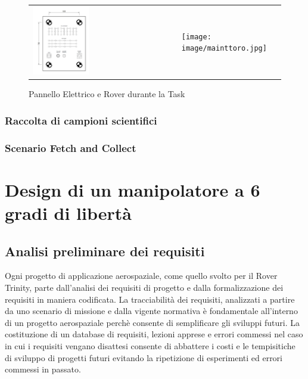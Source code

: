 \documentclass[%
corpo=11pt,
twoside,
 stile=classica,
oldstyle,
greek,%
]{toptesi}
\begin{document}
		\begin{figure}
		\centering
		\begin{tabular}{ll}
		\includegraphics[width=0.4\textwidth]{image/panel.png}
		&
		\texttt{[image: image/mainttoro.jpg]}
		\end{tabular}
		\caption{Pannello Elettrico e Rover durante la Task}
		\label{fig:maintanance}
		\end{figure}
	
		\subsection{Raccolta di campioni scientifici}
		\subsection{Scenario Fetch and Collect}
\chapter{Design di un manipolatore a 6 gradi di libertà}
\section{Analisi preliminare dei requisiti}
Ogni progetto di applicazione aerospaziale, come quello svolto per il Rover Trinity, parte dall'analisi dei requisiti di progetto e dalla formalizzazione dei requisiti in maniera codificata. 
La tracciabilità dei requisiti, analizzati a partire da uno scenario di missione e dalla vigente normativa è fondamentale all'interno di un progetto aerospaziale perchè consente di semplificare gli sviluppi futuri.
La costituzione di un database di requisiti, lezioni apprese e errori commessi nel caso in cui i requisiti vengano disattesi consente di abbattere i costi e le tempisitiche di sviluppo di progetti futuri evitando la ripetizione di esperimenti ed errori commessi in passato. 
\end{document}

